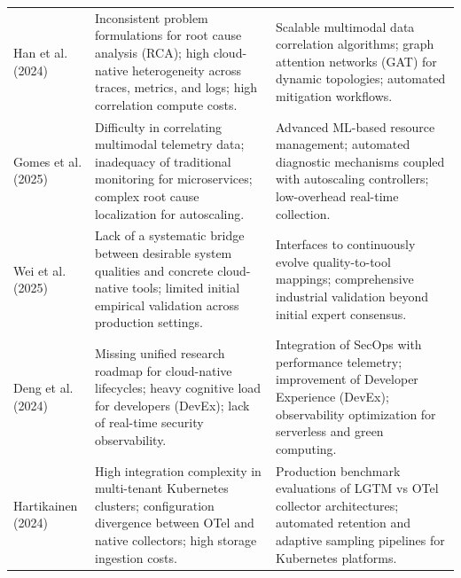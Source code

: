 \begin{table}[!ht]
\begin{tabular}{p{} p{} p{}}
Han et al. (2024) \cite{han_2024} &
Inconsistent problem formulations for root cause analysis (RCA); high cloud-native heterogeneity across traces, metrics, and logs; high correlation compute costs. & 
Scalable multimodal data correlation algorithms; graph attention networks (GAT) for dynamic topologies; automated mitigation workflows. \\ \addlinespace

Gomes et al. (2025) \cite{gomes_2025} &
Difficulty in correlating multimodal telemetry data; inadequacy of traditional monitoring for microservices; complex root cause localization for autoscaling. & 
Advanced ML-based resource management; automated diagnostic mechanisms coupled with autoscaling controllers; low-overhead real-time collection. \\ \addlinespace

Wei et al. (2025) \cite{wei_2025} &
Lack of a systematic bridge between desirable system qualities and concrete cloud-native tools; limited initial empirical validation across production settings. &
Interfaces to continuously evolve quality-to-tool mappings; comprehensive industrial validation beyond initial expert consensus. \\ \addlinespace

Deng et al. (2024) \cite{deng_2024} &
Missing unified research roadmap for cloud-native lifecycles; heavy cognitive load for developers (DevEx); lack of real-time security observability. & 
Integration of SecOps with performance telemetry; improvement of Developer Experience (DevEx); observability optimization for serverless and green computing. \\ \addlinespace

Hartikainen (2024) \cite{hartikainen_2024} &
High integration complexity in multi-tenant Kubernetes clusters; configuration divergence between OTel and native collectors; high storage ingestion costs. &
Production benchmark evaluations of LGTM vs OTel collector architectures; automated retention and adaptive sampling pipelines for Kubernetes platforms. \\ \bottomrule
\end{tabular}
\end{table}